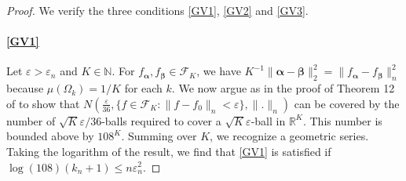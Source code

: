 \documentclass{article}
\newcommand{\1}{\mathbb{I}}
\newcommand{\R}{\mathbb{R}}
\newcommand{\e}{\varepsilon}
\newcommand{\bm}[1]{\boldsymbol{#1}}
\def\b{\bm{\beta}}
\def\b{\bm{\beta}}
\theoremstyle{assumption}
\begin{document}
\begin{proof}
\vspace{-0.15cm}
We verify the three conditions \ref{GV1}, \ref{GV2} and \ref{GV3}. 

\paragraph{\ref{GV1}}
\vspace{-0.3cm}
Let $\e > \e_n$ and  $K \in \mathbb{N}$. For $f_{\bm{\alpha}},f_{\b} \in \mathcal{F}_{K}$, we have $K^{-1}\|\bm{\alpha} - \b\|_2^2 = \|f_{\bm{\alpha}} - f_{\b}\|_n^2$ because $\mu(\Omega_k) = 1/K$ for each $k$. We now argue as in the proof of Theorem 12 of \cite{Ghosal2007} to show that  $N\left(\tfrac{\e}{36}, \{f \in \mathcal{F}_K : \|f - f_0\|_n < \e\}, \|.\|_n\right)$ can be covered by the number of $\sqrt{K}\e/36$-balls required to cover a $\sqrt{K}\e$-ball in $\R^{K}$. This number is bounded above by $108^K$. Summing over $K$, we recognize a geometric series. Taking the logarithm of the result, we find that \ref{GV1} is satisfied if $\log(108)(k_n+1) \leq n\e_n^2$.


\end{proof}
\end{document}
